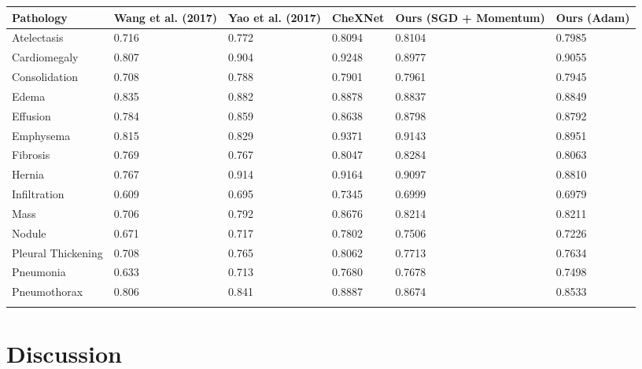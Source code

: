 \documentclass{amia}
\begin{document}
\begin{center}
\begin{tabular}{p{3cm}|p{2cm}|p{2cm}|p{2cm}|p{2cm}|p{2cm}}
Pathology          & Wang et al. (2017) & Yao et al. (2017) & CheXNet & Ours (SGD + Momentum) & Ours (Adam) \\
\midrule
Atelectasis        & 0.716              & 0.772             & 0.8094  & 0.8104     & 0.7985      \\
Cardiomegaly       & 0.807              & 0.904             & 0.9248  & 0.8977     & 0.9055      \\
Consolidation      & 0.708              & 0.788             & 0.7901  & 0.7961     & 0.7945      \\
Edema              & 0.835              & 0.882             & 0.8878  & 0.8837     & 0.8849      \\
Effusion           & 0.784              & 0.859             & 0.8638  & 0.8798     & 0.8792      \\
Emphysema          & 0.815              & 0.829             & 0.9371  & 0.9143     & 0.8951      \\
Fibrosis           & 0.769              & 0.767             & 0.8047  & 0.8284     & 0.8063      \\
Hernia             & 0.767              & 0.914             & 0.9164  & 0.9097     & 0.8810      \\
Infiltration       & 0.609              & 0.695             & 0.7345  & 0.6999     & 0.6979      \\
Mass               & 0.706              & 0.792             & 0.8676  & 0.8214     & 0.8211      \\
Nodule             & 0.671              & 0.717             & 0.7802  & 0.7506     & 0.7226      \\
Pleural Thickening & 0.708              & 0.765             & 0.8062  & 0.7713     & 0.7634      \\
Pneumonia          & 0.633              & 0.713             & 0.7680  & 0.7678     & 0.7498      \\
Pneumothorax       & 0.806              & 0.841             & 0.8887  & 0.8674     & 0.8533      \\
\label{fig2}
\end{tabular}
\end{center}

\section*{Discussion}
\end{document}
